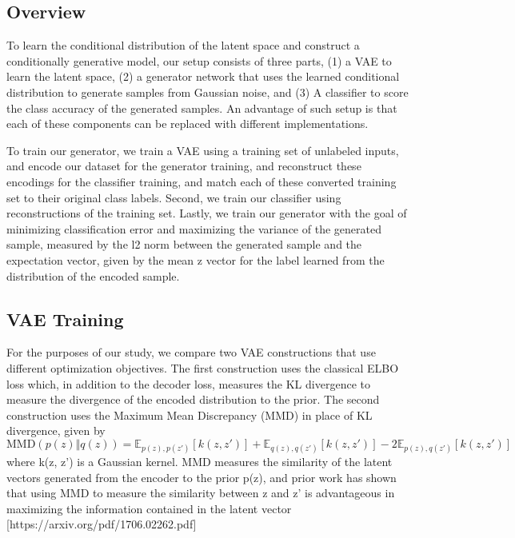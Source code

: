 \documentclass{article}
\begin{document}
\subsection{Overview}

To learn the conditional distribution of the latent space and construct a conditionally generative model, our setup consists of three parts, (1) a VAE to learn the latent space, (2) a generator network that uses the learned conditional distribution to generate samples from Gaussian noise, and (3) A classifier to score the class accuracy of the generated samples. An advantage of such setup is that each of these components can be replaced with different implementations.\par
To train our generator, we train a VAE using a training set of unlabeled inputs, and encode our dataset for the generator training, and reconstruct these encodings for the classifier training, and match each of these converted training set to their original class labels. Second, we train our classifier using reconstructions of the training set. Lastly, we train our generator with the goal of minimizing classification error and maximizing the variance of the generated sample, measured by the l2 norm between the generated sample and the expectation vector, given by the mean z vector for the label learned from the distribution of the encoded sample.

\subsection{VAE Training}

For the purposes of our study, we compare two VAE constructions that use different optimization objectives. The first construction uses the classical ELBO loss which, in addition to the decoder loss, measures the KL divergence to measure the divergence of the encoded distribution to the prior. The second construction uses the Maximum Mean Discrepancy (MMD) in place of KL divergence, given by
\begin{equation} 
\mathrm{MMD}(p(z) \Vert q(z)) = \mathbb{E}_{p(z), p(z')}[k(z, z')] + \mathbb{E}_{q(z), q(z')}[k(z, z')]  - 2 \mathbb{E}_{p(z), q(z')}[k(z, z')]
\end{equation}
where k(z, z') is a Gaussian kernel. MMD measures the similarity of the latent vectors generated from the encoder to the prior p(z), and prior work has shown that using MMD  to measure the similarity between z and z' is advantageous in maximizing the information contained in the latent vector [https://arxiv.org/pdf/1706.02262.pdf]
\end{document}
